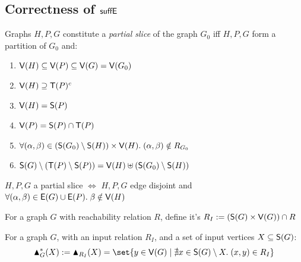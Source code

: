 \subsection{Correctness of $\mathrel{\textup{\textsf{suffE}}_{}}$}

\begin{definition}
   \label{def:partial-slice}
   Graphs $H,P,G$ constitute a \textit{partial slice} of the graph $G_0$ iff $H,P,G$ form a partition of $G_0$ and:
   \begin{enumerate}[label=(\roman*)]
      \item $\textup{\textsf{V}}(H) \subseteq \textup{\textsf{V}}(P) \subseteq \textup{\textsf{V}}(G) = \textup{\textsf{V}}(G_0)$
      \item $\textup{\textsf{V}}(H) \supseteq \mathsf{T}(P)^{c}$
      \item $\textup{\textsf{V}}(H) = \mathsf{S}(P)$
      \item $\textup{\textsf{V}}(P) = \mathsf{S}(P) \cap \mathsf{T}(P)$
      \item $\forall (\alpha,\beta) \in (\mathsf{S}(G_0) \setminus \mathsf{S}(H)) \times \textup{\textsf{V}}(H).\;(\alpha,\beta) \notin R_{G_0}$
      \item $\mathsf{S}(G)\setminus(\mathsf{T}(P)\setminus\mathsf{S}(P)) = \textup{\textsf{V}}(H) \uplus (\mathsf{S}(G_0)\setminus\mathsf{S}(H))$
   \end{enumerate}
\end{definition}
\begin{corollary}
   $H,P,G$ a partial slice $\iff$ $H,P,G$ edge disjoint and $\forall (\alpha,\beta) \in \textup{\textsf{E}}(G) \cup \textup{\textsf{E}}(P).\;\beta \notin \textup{\textsf{V}}(H)$
\end{corollary}
\begin{definition}
   For a graph $G$ with reachability relation $R$, define it's 
   $R_{I} := (\mathsf{S}(G) \times \textup{\textsf{V}}(G)) \cap R$
\end{definition}

\begin{definition}
   For a graph $G$, with an input relation $R_{I}$, and a set of input vertices $X \subseteq \mathsf{S}(G)$:
   \[\sufficesR^*_{G}(X) \eqdef \sufficesR_{R_{I}}(X) = \set{y \in \V(G) \mid \nexists x \in \sources{G} \setminus X.\; (x,y) \in R_{I}}\]
\end{definition}

